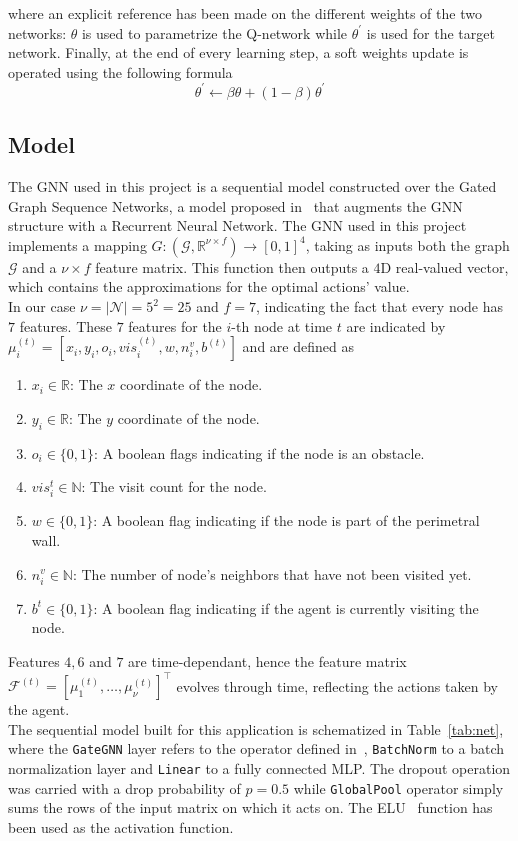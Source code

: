 \documentclass[a4paper]{article}
\begin{document}
where an explicit reference has been made on the different weights of the two networks: $\theta$ is used to parametrize the Q-network while $\theta^{\prime}$ is used for the target network. Finally, at the end of every learning step, a soft weights update is operated using the following formula
\begin{equation}
    \theta^{\prime} \leftarrow \beta \theta + (1-\beta)\theta^{\prime}
\end{equation}

\subsection{Model}
The GNN used in this project is a sequential model constructed over the Gated Graph Sequence Networks, a model proposed in~\cite{li2015gated} that augments the GNN structure with a Recurrent Neural Network. The GNN used in this project implements a mapping $G: (\mathcal{G}, \mathbb{R}^{\nu \times f}) \to [0,1]^4$, taking as inputs both the graph $\mathcal{G}$ and a $\nu \times f$ feature matrix. This function then outputs a $4$D real-valued vector, which contains the approximations for the optimal actions' value.\\
In our case $\nu = |\mathcal{N}| = 5^2 = 25$ and $f=7$, indicating the fact that every node has $7$ features. These $7$ features for the $i$-th node at time $t$ are indicated by $\mu_i^{(t)} = [x_i, y_i, o_i, vis_i^{(t)}, w, n_i^v, b^{(t)}]$ and are defined as
\begin{enumerate}
    \item $x_i \in \mathbb{R}$: The $x$ coordinate of the node.
    \item $y_i \in \mathbb{R}$: The $y$ coordinate of the node.
    \item $o_i \in \{0, 1\}$: A boolean flags indicating if the node is an obstacle.
    \item $vis_i^t \in \mathbb{N}$: The visit count for the node.
    \item $w \in \{0, 1\}$: A boolean flag indicating if the node is part of the perimetral wall.
    \item $n_i^v \in \mathbb{N}$: The number of node's neighbors that have not been visited yet.
    \item $b^t \in \{0, 1\}$: A boolean flag indicating if the agent is currently visiting the node.
\end{enumerate}
Features $4, 6$ and $7$ are time-dependant, hence the feature matrix $\mathcal{F}^{(t)} = [\mu_1^{(t)}, \dots, \mu_\nu^{(t)}]^\intercal$ evolves through time, reflecting the actions taken by the agent. \\
The sequential model built for this application is schematized in Table~\ref{tab:net}, where the \texttt{GateGNN} layer refers to the operator defined in~\cite{li2015gated}, \texttt{BatchNorm} to a batch normalization layer and \texttt{Linear} to a fully connected MLP. The dropout operation was carried with a drop probability of $p = 0.5$ while \texttt{GlobalPool} operator simply sums the rows of the input matrix on which it acts on. The ELU~\cite{clevert2015fast} function has been used as the activation function.  
\end{document}
